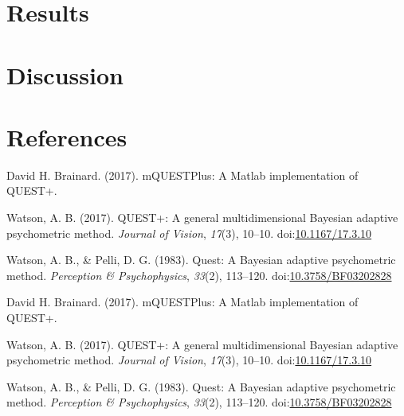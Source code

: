\documentclass[
  man,floatsintext]{apa6}
\newlength{\cslhangindent}
\newenvironment{cslreferences}%
  {\setlength{\parindent}{0pt}%
  \everypar{\setlength{\hangindent}{\cslhangindent}}\ignorespaces}%
  {\par}
\begin{document}
\hypertarget{results-1}{%
\section{Results}\label{results-1}}

\hypertarget{discussion-1}{%
\section{Discussion}\label{discussion-1}}

\newpage

\hypertarget{references}{%
\section{References}\label{references}}

\begingroup
\setlength{\parindent}{-0.5in}
\setlength{\leftskip}{0.5in}

\hypertarget{refs}{}
\begin{cslreferences}
\leavevmode\hypertarget{ref-davidh.brainardMQUESTPlusMatlabImplementation2017}{}%
David H. Brainard. (2017). mQUESTPlus: A Matlab implementation of QUEST+.

\leavevmode\hypertarget{ref-watsonQUESTGeneralMultidimensional2017}{}%
Watson, A. B. (2017). QUEST+: A general multidimensional Bayesian adaptive psychometric method. \emph{Journal of Vision}, \emph{17}(3), 10--10. doi:\href{https://doi.org/10.1167/17.3.10}{10.1167/17.3.10}

\leavevmode\hypertarget{ref-watsonQuestBayesianAdaptive1983}{}%
Watson, A. B., \& Pelli, D. G. (1983). Quest: A Bayesian adaptive psychometric method. \emph{Perception \& Psychophysics}, \emph{33}(2), 113--120. doi:\href{https://doi.org/10.3758/BF03202828}{10.3758/BF03202828}

\leavevmode\hypertarget{ref-davidh.brainardMQUESTPlusMatlabImplementation2017}{}%
David H. Brainard. (2017). mQUESTPlus: A Matlab implementation of QUEST+.

\leavevmode\hypertarget{ref-watsonQUESTGeneralMultidimensional2017}{}%
Watson, A. B. (2017). QUEST+: A general multidimensional Bayesian adaptive psychometric method. \emph{Journal of Vision}, \emph{17}(3), 10--10. doi:\href{https://doi.org/10.1167/17.3.10}{10.1167/17.3.10}

\leavevmode\hypertarget{ref-watsonQuestBayesianAdaptive1983}{}%
Watson, A. B., \& Pelli, D. G. (1983). Quest: A Bayesian adaptive psychometric method. \emph{Perception \& Psychophysics}, \emph{33}(2), 113--120. doi:\href{https://doi.org/10.3758/BF03202828}{10.3758/BF03202828}
\end{cslreferences}

\endgroup
\end{document}
